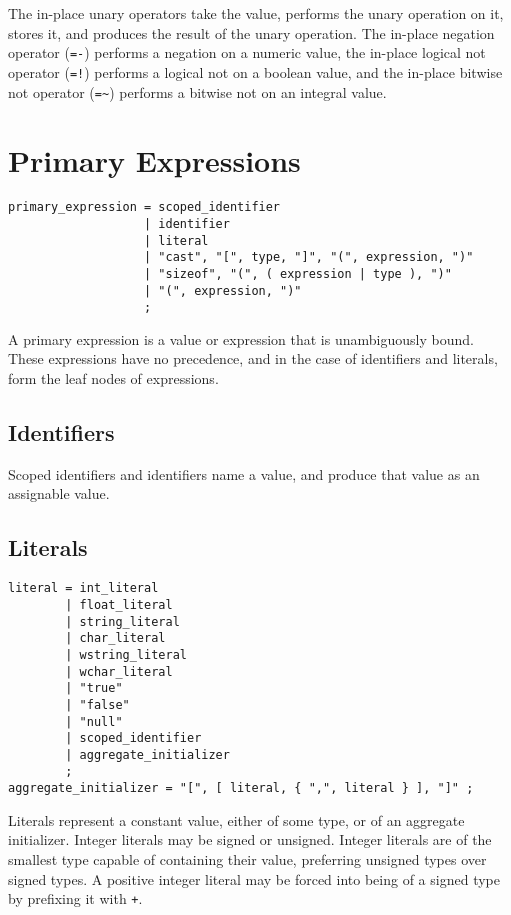 \documentclass[letterpaper,12pt]{book}
\begin{document}
The in-place unary operators take the value, performs the unary operation on it, stores it, and produces the result of the unary operation. The in-place negation operator (\texttt{=-}) performs a negation on a numeric value, the in-place logical not operator (\texttt{=!}) performs a logical not on a boolean value, and the in-place bitwise not operator (\texttt{=\~{}}) performs a bitwise not on an integral value.

\section{Primary Expressions}

\begin{lstlisting}[breaklines=true]
primary_expression = scoped_identifier
                   | identifier
                   | literal
                   | "cast", "[", type, "]", "(", expression, ")"
                   | "sizeof", "(", ( expression | type ), ")"
                   | "(", expression, ")"
                   ;
\end{lstlisting}

A primary expression is a value or expression that is unambiguously bound. These expressions have no precedence, and in the case of identifiers and literals, form the leaf nodes of expressions.

\subsection{Identifiers}

Scoped identifiers and identifiers name a value, and produce that value as an assignable value.

\subsection{Literals}

\begin{lstlisting}[breaklines=true]
literal = int_literal
        | float_literal
        | string_literal
        | char_literal
        | wstring_literal
        | wchar_literal
        | "true"
        | "false"
        | "null"
        | scoped_identifier
        | aggregate_initializer
        ;
aggregate_initializer = "[", [ literal, { ",", literal } ], "]" ;
\end{lstlisting}

Literals represent a constant value, either of some type, or of an aggregate initializer. Integer literals may be signed or unsigned. Integer literals are of the smallest type capable of containing their value, preferring unsigned types over signed types. A positive integer literal may be forced into being of a signed type by prefixing it with \texttt{+}.
\end{document}
